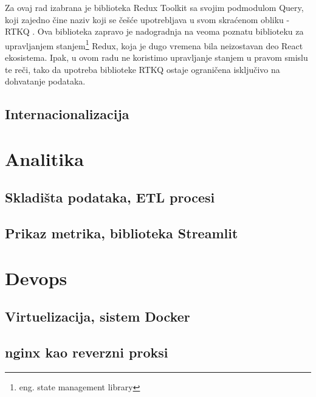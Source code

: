 \documentclass[12pt,oneside]{memoir}
\begin{document}
Za ovaj rad izabrana je biblioteka Redux Toolkit sa svojim podmodulom Query, koji zajedno čine naziv koji se češće upotrebljava u svom skraćenom obliku - RTKQ \cite{rtkqdocs}. Ova biblioteka zapravo je nadogradnja na veoma poznatu biblioteku za upravljanjem stanjem\footnote{eng. state management library} Redux, koja je dugo vremena bila neizostavan deo React ekosistema. Ipak, u ovom radu ne koristimo upravljanje stanjem u pravom smislu te reči, tako da upotreba biblioteke RTKQ ostaje ograničena isključivo na dohvatanje podataka.  




\label{sec:intl}
\section{Internacionalizacija}




\chapter{Analitika}
\section{Skladišta podataka, ETL procesi}
\section{Prikaz metrika, biblioteka Streamlit}

\chapter{Devops}
\section{Virtuelizacija, sistem Docker}
\section{nginx kao reverzni proksi}
\end{document}
